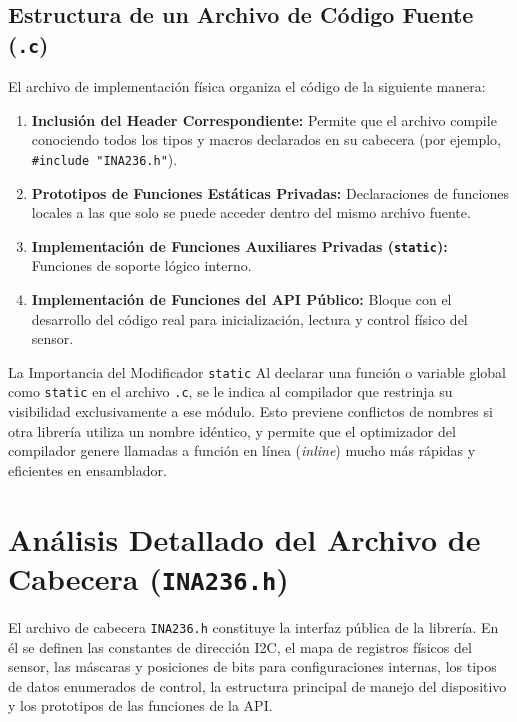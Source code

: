 \documentclass[
10pt, %
a4paper, %
oneside, %
headinclude,footinclude, %
BCOR5mm, %
]{scrartcl}
\begin{document}
\subsection{Estructura de un Archivo de Código Fuente (\texttt{.c})}
El archivo de implementación física organiza el código de la siguiente manera:

\begin{enumerate}
	\item \textbf{Inclusión del Header Correspondiente:} Permite que el archivo compile conociendo todos los tipos y macros declarados en su cabecera (por ejemplo, \texttt{\#include "INA236.h"}).
	\item \textbf{Prototipos de Funciones Estáticas Privadas:} Declaraciones de funciones locales a las que solo se puede acceder dentro del mismo archivo fuente.
	\item \textbf{Implementación de Funciones Auxiliares Privadas (\texttt{static}):} Funciones de soporte lógico interno.
	\item \textbf{Implementación de Funciones del API Público:} Bloque con el desarrollo del código real para inicialización, lectura y control físico del sensor.
\end{enumerate}

\begin{WarningBox}{La Importancia del Modificador \texttt{static}}
	Al declarar una función o variable global como \texttt{static} en el archivo \texttt{.c}, se le indica al compilador que restrinja su visibilidad exclusivamente a ese módulo. Esto previene conflictos de nombres si otra librería utiliza un nombre idéntico, y permite que el optimizador del compilador genere llamadas a función en línea (\textit{inline}) mucho más rápidas y eficientes en ensamblador.
\end{WarningBox}

\newpage
\section{Análisis Detallado del Archivo de Cabecera (\texttt{INA236.h})}

El archivo de cabecera \texttt{INA236.h} constituye la interfaz pública de la librería. En él se definen las constantes de dirección I2C, el mapa de registros físicos del sensor, las máscaras y posiciones de bits para configuraciones internas, los tipos de datos enumerados de control, la estructura principal de manejo del dispositivo y los prototipos de las funciones de la API.
\end{document}
